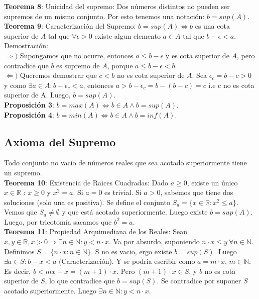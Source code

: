 \documentclass[11pt,a4paper]{article}
\begin{document}
\noindent \dotfill

\noindent \textbf{Teorema 8}: Unicidad del supremo: Dos n\'umeros distintos no pueden ser supremos de un mismo conjunto. Por esto tenemos una notaci\'on: $b = sup(A)$.\\
\noindent \textbf{Teorema 9}: Caracterizaci\'on del Supremo: $b = sup(A) \iff b$ es una cota superior de $A$ tal que $\forall \epsilon > 0$ existe algun elemento $a \in A$ tal que $b - \epsilon < a$.\\
Demostraci\'on:\\
$\Rightarrow )$ Supongamos que no ocurre, entonces $a \leq b - \epsilon$ y es cota superior de $A$, pero contradice que $b$ es supremo de $A$, porque $a \leq b - \epsilon < b$.\\
$\Leftarrow )$ Queremos demostrar que $c < b$ no es cota superior de $A$. Sea $\epsilon_c = b - c > 0$ y como $\exists a \in A : b - \epsilon_c < a$, entonces $a > b - \epsilon_c = b - (b - c) = c$ i.e c no es cota superior de A. Luego, $b = sup(A)$.\\
\noindent \textbf{Proposici\'on 3}: $b = max(A) \iff b \in A \land b = sup(A)$.\\
\noindent \textbf{Proposici\'on 4}: $b = min(A) \iff b \in A \land b = inf(A)$.

\subsection{Axioma del Supremo}
Todo conjunto no vac\'io de n\'umeros reales que sea acotado superiormente tiene un supremo.\\

\noindent \textbf{Teorema 10}: Existencia de Raices Cuadradas: Dado $a \geq 0$, existe un \'unico $x \in \mathbb{R}$ : $x \geq 0$ y $x^2 = a$. Si $a=0$ es trivial. Si $a > 0$, sabemos que tiene dos soluciones (solo una es positiva). Se define el conjunto $S_a = \{ x \in \mathbb{R} : x^2 \leq a \}$. Vemos que $S_a \not = \emptyset$ y que est\'a acotado superiormente. Luego existe $b = sup(A)$. Luego, por tricotom\'ia sacamos que $b^2 = a$.\\

\noindent \textbf{Teorema 11}: Propiedad Arquimediana de los Reales: Sean $x,y \in \mathbb{R}, x > 0 \Rightarrow \exists n \in \mathbb{N} : y < n \cdot x$. Va por absurdo, suponiendo $n\cdot x \leq y\ \forall n \in \mathbb{N}$. Definimos $S = \{ n\cdot x : n \in \mathbb{N} \}$. S no es vacio, ergo existe $b=sup(S)$. Luego $\exists a \in S : b - x < a$ (Caracterizaci\'on). Y se podria escribir como $a = m \cdot x$, $m \in \mathbb{N}$. Es decir, $b < mx + x = (m+1) \cdot x$. Pero $(m+1) \cdot x \in S$, y $b$ no es cota superior de $S$, lo que contradice que $b = sup(S)$. Se contradice por suponer $S$ acotado superiormente. Luego $\exists n \in \mathbb{N} : y < n\cdot x$.\\
\end{document}
